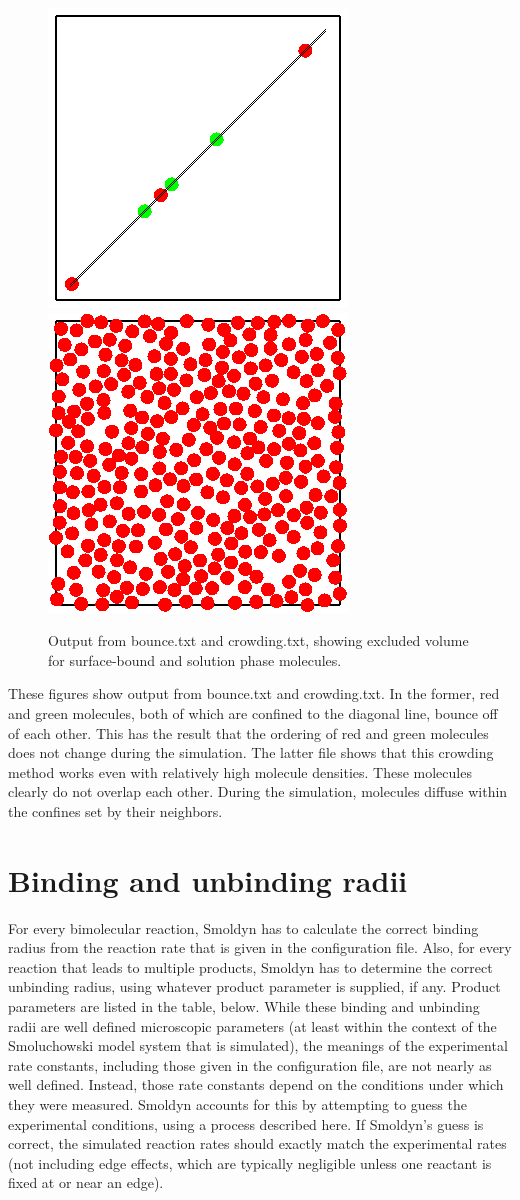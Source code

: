 \documentclass {book}
\begin{document}
\begin{figure}[h]
\centering
\includegraphics[height=5 cm]{figures/image58}
\includegraphics[height=5 cm]{figures/image59}
\caption{Output from bounce.txt and crowding.txt, showing excluded volume for surface-bound and solution phase molecules.}
\label{fig:crowding}
\end{figure}

These figures show output from bounce.txt and crowding.txt. In the former, red and green molecules, both of which are confined to the diagonal line, bounce off of each other. This has the result that the ordering of red and green molecules does not change during the simulation. The latter file shows that this crowding method works even with relatively high molecule densities. These molecules clearly do not overlap each other. During the simulation, molecules diffuse within the confines set by their neighbors.

\section{Binding and unbinding radii}

For every bimolecular reaction, Smoldyn has to calculate the correct binding radius from the reaction rate that is given in the configuration file. Also, for every reaction that leads to multiple products, Smoldyn has to determine the correct unbinding radius, using whatever product parameter is supplied, if any. Product parameters are listed in the table, below. While these binding and unbinding radii are well defined microscopic parameters (at least within the context of the Smoluchowski model system that is simulated), the meanings of the experimental rate constants, including those given in the configuration file, are not nearly as well defined. Instead, those rate constants depend on the conditions under which they were measured. Smoldyn accounts for this by attempting to guess the experimental conditions, using a process described here. If Smoldyn's guess is correct, the simulated reaction rates should exactly match the experimental rates (not including edge effects, which are typically negligible unless one reactant is fixed at or near an edge).
\end{document}
